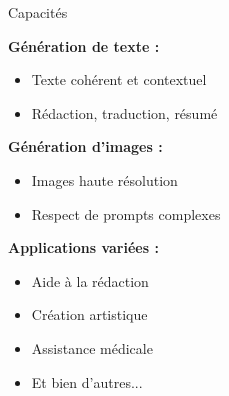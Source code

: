 \begin{frame}{Capacités}

\textbf{Génération de texte :}
\begin{itemize}
    \item Texte cohérent et contextuel
    \item Rédaction, traduction, résumé
\end{itemize}

\vspace{0.3cm}

\textbf{Génération d'images :}
\begin{itemize}
    \item Images haute résolution
    \item Respect de prompts complexes
\end{itemize}

\vspace{0.3cm}

\textbf{Applications variées :}
\begin{itemize}
    \item Aide à la rédaction
    \item Création artistique
    \item Assistance médicale
    \item Et bien d'autres...
\end{itemize}

\end{frame}

